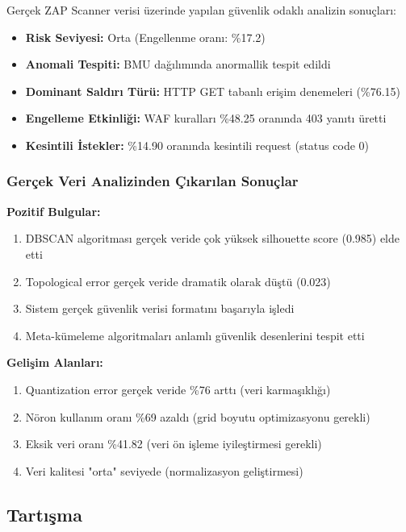 Gerçek ZAP Scanner verisi üzerinde yapılan güvenlik odaklı analizin sonuçları:

\begin{itemize}
    \item \textbf{Risk Seviyesi:} Orta (Engellenme oranı: \%17.2)
    \item \textbf{Anomali Tespiti:} BMU dağılımında anormallik tespit edildi
    \item \textbf{Dominant Saldırı Türü:} HTTP GET tabanlı erişim denemeleri (\%76.15)
    \item \textbf{Engelleme Etkinliği:} WAF kuralları \%48.25 oranında 403 yanıtı üretti
    \item \textbf{Kesintili İstekler:} \%14.90 oranında kesintili request (status code 0)
\end{itemize}



\subsubsection{Gerçek Veri Analizinden Çıkarılan Sonuçlar}

\textbf{Pozitif Bulgular:}
\begin{enumerate}
    \item DBSCAN algoritması gerçek veride çok yüksek silhouette score (0.985) elde etti
    \item Topological error gerçek veride dramatik olarak düştü (0.023)
    \item Sistem gerçek güvenlik verisi formatını başarıyla işledi
    \item Meta-kümeleme algoritmaları anlamlı güvenlik desenlerini tespit etti
\end{enumerate}

\textbf{Gelişim Alanları:}
\begin{enumerate}
    \item Quantization error gerçek veride \%76 arttı (veri karmaşıklığı)
    \item Nöron kullanım oranı \%69 azaldı (grid boyutu optimizasyonu gerekli)
    \item Eksik veri oranı \%41.82 (veri ön işleme iyileştirmesi gerekli)
    \item Veri kalitesi "orta" seviyede (normalizasyon geliştirmesi)
\end{enumerate}

\newpage

\subsection{Tartışma}

